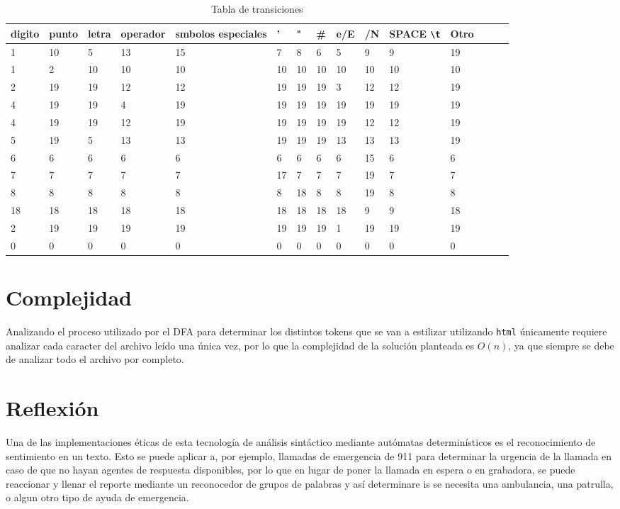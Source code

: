 \documentclass{article}
\begin{document}
\begin{table}
\centering
\caption{Tabla de transiciones}
\label{tab:tabla}
\begin{tabular}{l l l l l l l l l l l l l l l}
    \toprule
    digito	& punto	& letra	& operador	& smbolos especiales	 & '	& " 	& \#	& e/E	& /N	& SPACE \verb|\t|	& Otro \\
    \midrule
    1	& 10	& 5	& 13	& 15	& 7	& 8	& 6	& 5	& 9	& 9	& 19 \\
    1	& 2	& 10	& 10	& 10	& 10	& 10	& 10	& 10	& 10	& 10	& 10 \\
    2	& 19	& 19	& 12	& 12	& 19	& 19	& 19	& 3	& 12	& 12	& 19 \\
    4	& 19	& 19	& 4	& 19	& 19	& 19	& 19	& 19	& 19	& 19	& 19 \\
    4	& 19	& 19	& 12	& 19	& 19	& 19	& 19	& 19	& 12	& 12	& 19 \\
    5	& 19	& 5	& 13	& 13	& 19	& 19	& 19	& 13	& 13	& 13	& 19 \\
    6	& 6	& 6	& 6	& 6	& 6	& 6	& 6	& 6	& 15	& 6	& 6 \\
    7	& 7	& 7	& 7	& 7	& 17	& 7	& 7	& 7	& 19	& 7	& 7 \\
    8	& 8	& 8	& 8	& 8	& 8	& 18	& 8	& 8	& 19	& 8	& 8 \\
    18	& 18	& 18	& 18	& 18	& 18	& 18	& 18	& 18	& 9	& 9	& 18 \\
    2	& 19	& 19	& 19	& 19	& 19	& 19	& 19	& 1	& 19	& 19	& 19 \\
    0	& 0	& 0	& 0	& 0	& 0	& 0	& 0	& 0	& 0	& 0	& 0 \\
    \bottomrule
\end{tabular}
\end{table}

\section{Complejidad}
Analizando el proceso utilizado por el DFA para determinar los distintos 
tokens que se van a estilizar utilizando \texttt{html} únicamente requiere 
analizar cada caracter del archivo leído una única vez, por lo que la 
complejidad de la solución planteada es $O(n)$, ya que siempre se debe de 
analizar todo el archivo por completo.

\section{Reflexión}
Una de las implementaciones éticas de esta tecnología de análisis sintáctico 
mediante autómatas determinísticos es el reconocimiento de sentimiento en un 
texto. Esto se puede aplicar a, por ejemplo, llamadas de emergencia de 911 
para determinar la urgencia de la llamada en caso de que no hayan agentes de 
respuesta disponibles, por lo que en lugar de poner la llamada en espera o en 
grabadora, se puede reaccionar y llenar el reporte mediante un reconocedor de 
grupos de palabras y así determinare is se necesita una ambulancia, una 
patrulla, o algun otro tipo de ayuda de emergencia.
\end{document}
